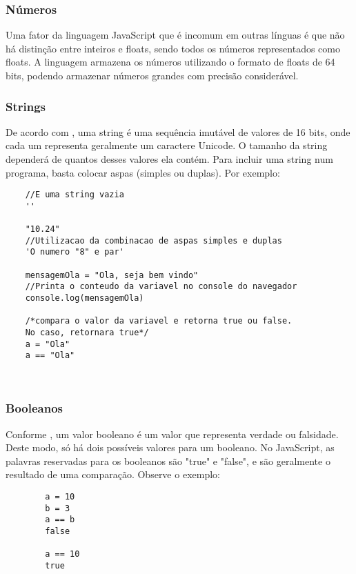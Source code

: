 	\subsubsection{Números}
	Uma fator da linguagem JavaScript que é incomum em outras línguas é que não há distinção entre inteiros e floats, sendo todos os números representados como floats. 
	A linguagem armazena os números utilizando o formato de floats de 64 bits, podendo armazenar números grandes com precisão considerável.
	
	\subsubsection{Strings}
	De acordo com \cite{flanagan2020javascript}, uma string é uma sequência imutável de valores de 16 bits, onde cada um representa geralmente um caractere Unicode. O tamanho da string dependerá de quantos desses valores ela contém. Para incluir uma string num programa, basta colocar aspas (simples ou duplas). Por exemplo:
	\newline
	
	\begin{lstlisting}
	//E uma string vazia
	''
	
	"10.24"	
	//Utilizacao da combinacao de aspas simples e duplas
	'O numero "8" e par'				
	
	mensagemOla = "Ola, seja bem vindo" 
	//Printa o conteudo da variavel no console do navegador
	console.log(mensagemOla)	
	
	/*compara o valor da variavel e retorna true ou false. 
	No caso, retornara true*/
	a = "Ola"
	a == "Ola"
	
	
	\end{lstlisting}
	
	\subsubsection{Booleanos}
	Conforme \cite{powers2015javascript}, um valor booleano é um valor que representa verdade ou falsidade. Deste modo, só há dois possíveis valores para um booleano. No JavaScript, as palavras reservadas para os booleanos são "true" e "false", e são geralmente o resultado de uma comparação. Observe o exemplo:
	\newline
	
	\begin{lstlisting}
		a = 10
		b = 3
		a == b
		false
		
		a == 10
		true
	\end{lstlisting}
